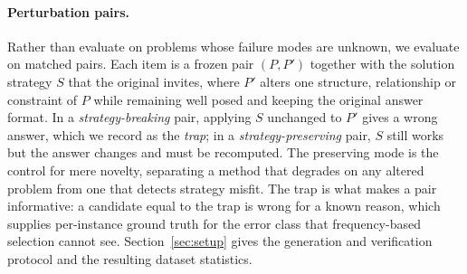 \paragraph{Perturbation pairs.}
Rather than evaluate on problems whose failure modes are unknown, we evaluate
on matched pairs. Each item is a frozen pair $(P, P')$ together with the
solution strategy $S$ that the original invites, where $P'$ alters one
structure, relationship or constraint of $P$ while remaining well posed and
keeping the original answer format. In a \emph{strategy-breaking} pair,
applying $S$ unchanged to $P'$ gives a wrong answer, which we record as the
\emph{trap}; in a \emph{strategy-preserving} pair, $S$ still works but the
answer changes and must be recomputed. The preserving mode is the control for
mere novelty, separating a method that degrades on any altered problem from one
that detects strategy misfit. The trap is what makes a pair informative: a
candidate equal to the trap is wrong for a known reason, which supplies
per-instance ground truth for the error class that frequency-based selection
cannot see. Section~\ref{sec:setup} gives the generation and verification
protocol and the resulting dataset statistics.

